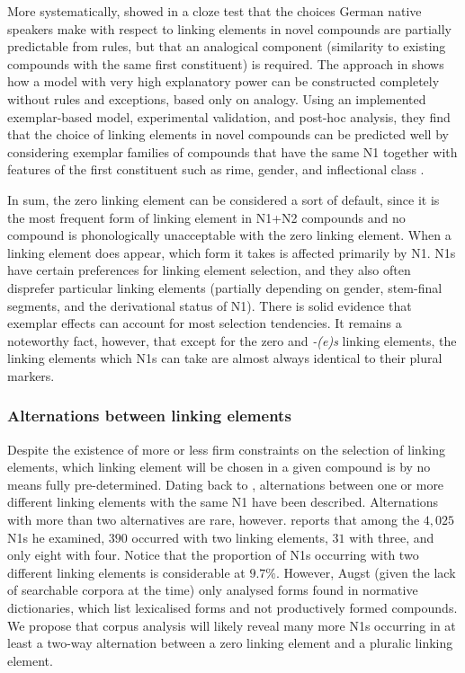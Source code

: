 More systematically, \textcite{DresslerEa2001} showed in a cloze test that the choices German native speakers make with respect to linking elements in novel compounds are partially predictable from rules, but that an analogical component (similarity to existing compounds with the same first constituent) is required.
The approach in \textcite{KrottEa2007} shows how a model with very high explanatory power can be constructed completely without rules and exceptions, based only on analogy.
Using an implemented exemplar-based model, experimental validation, and post-hoc analysis, they find that the choice of linking elements in novel compounds can be predicted well by considering exemplar families of compounds that have the same N1 together with features of the first constituent such as rime, gender, and inflectional class \parencite[47]{KrottEa2007}.

In sum, the zero linking element can be considered a sort of default, since it is the most frequent form of linking element in N1+N2 compounds and no compound is phonologically unacceptable with the zero linking element.
When a linking element does appear, which form it takes is affected primarily by N1.
N1s have certain preferences for linking element selection, and they also often disprefer particular linking elements (partially depending on gender, stem-final segments, and the derivational status of N1).
There is solid evidence that exemplar effects can account for most selection tendencies.
It remains a noteworthy fact, however, that except for the zero and \textit{-(e)s} linking elements, the linking elements which N1s can take are almost always identical to their plural markers.

\subsubsection{Alternations between linking elements}

Despite the existence of more or less firm constraints on the selection of linking elements, which linking element will be chosen in a given compound is by no means fully pre-determined.
Dating back to \textcite{Augst1975}, alternations between one or more different linking elements with the same N1 have been described.
Alternations with more than two alternatives are rare, however.
\textcite[134--135]{Augst1975} reports that among the $4,025$ N1s he examined, $390$ occurred with two linking elements, $31$ with three, and only eight with four.
Notice that the proportion of N1s occurring with two different linking elements is considerable at $9.7\%$.
However, Augst (given the lack of searchable corpora at the time) only analysed forms found in normative dictionaries, which list lexicalised forms and not productively formed compounds.
We propose that corpus analysis will likely reveal many more N1s occurring in at least a two-way alternation between a zero linking element and a pluralic linking element. %

